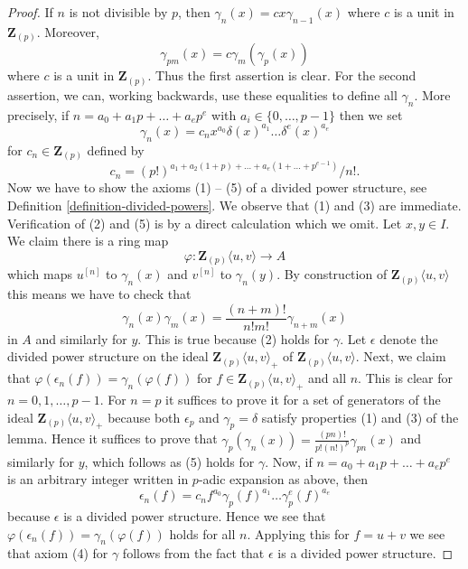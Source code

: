 \documentclass{stacks-project}
\theoremstyle{plain}
\theoremstyle{definition}
\theoremstyle{remark}
\numberwithin{equation}{subsection}
\begin{document}
\begin{proof}
If $n$ is not divisible by $p$, then $\gamma_n(x) = c x \gamma_{n - 1}(x)$
where $c$ is a unit in $\mathbf{Z}_{(p)}$. Moreover,
$$
\gamma_{pm}(x) = c \gamma_m(\gamma_p(x))
$$
where $c$ is a unit in $\mathbf{Z}_{(p)}$. Thus the first assertion is clear.
For the second assertion, we can, working backwards, use these equalities
to define all $\gamma_n$. More precisely, if
$n = a_0 + a_1p + \ldots + a_e p^e$ with $a_i \in \{0, \ldots, p - 1\}$ then
we set
$$
\gamma_n(x) = c_n x^{a_0} \delta(x)^{a_1} \ldots \delta^e(x)^{a_e}
$$
for $c_n \in \mathbf{Z}_{(p)}$ defined by
$$
c_n =
{(p!)^{a_1 + a_2(1 + p) + \ldots + a_e(1 + \ldots + p^{e - 1})}}/{n!}.
$$
Now we have to show the axioms (1) -- (5) of a divided power structure, see
Definition \ref{definition-divided-powers}. We observe that (1) and (3) are
immediate. Verification of (2) and (5) is by a direct calculation which
we omit. Let $x, y \in I$. We claim there is a ring map
$$
\varphi : \mathbf{Z}_{(p)}\langle u, v \rangle \longrightarrow A
$$
which maps $u^{[n]}$ to $\gamma_n(x)$ and $v^{[n]}$ to $\gamma_n(y)$.
By construction of $\mathbf{Z}_{(p)}\langle u, v \rangle$ this means
we have to check that
$$
\gamma_n(x)\gamma_m(x) = \frac{(n + m)!}{n!m!} \gamma_{n + m}(x)
$$
in $A$ and similarly for $y$. This is true because (2) holds for $\gamma$.
Let $\epsilon$ denote the divided power structure on the
ideal $\mathbf{Z}_{(p)}\langle u, v\rangle_{+}$ of
$\mathbf{Z}_{(p)}\langle u, v\rangle$.
Next, we claim that $\varphi(\epsilon_n(f)) = \gamma_n(\varphi(f))$
for $f \in \mathbf{Z}_{(p)}\langle u, v\rangle_{+}$ and all $n$.
This is clear for $n = 0, 1, \ldots, p - 1$. For $n = p$ it suffices
to prove it for a set of generators of the ideal
$\mathbf{Z}_{(p)}\langle u, v\rangle_{+}$ because both $\epsilon_p$
and $\gamma_p = \delta$ satisfy properties (1) and (3) of the lemma.
Hence it suffices to prove that
$\gamma_p(\gamma_n(x)) = \frac{(pn)!}{p!(n!)^p}\gamma_{pn}(x)$ and
similarly for $y$, which follows as (5) holds for $\gamma$.
Now, if $n = a_0 + a_1p + \ldots + a_e p^e$
is an arbitrary integer written in $p$-adic expansion as above, then
$$
\epsilon_n(f) =
c_n f^{a_0} \gamma_p(f)^{a_1} \ldots \gamma_p^e(f)^{a_e}
$$
because $\epsilon$ is a divided power structure. Hence we see that
$\varphi(\epsilon_n(f)) = \gamma_n(\varphi(f))$ holds for all $n$.
Applying this for $f = u + v$ we see that axiom (4) for $\gamma$
follows from the fact that $\epsilon$ is a divided power structure.
\end{proof}
\end{document}
